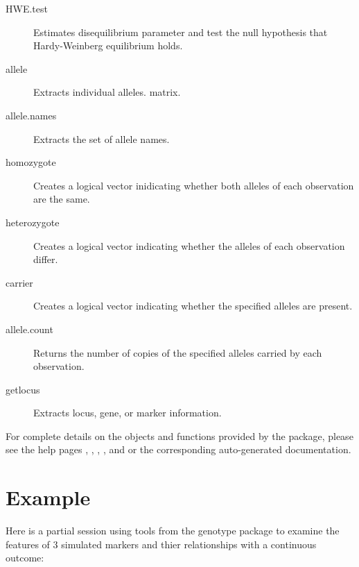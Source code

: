 \documentclass{report}
\begin{document}
\begin{description}
  
\item[HWE.test] Estimates disequilibrium parameter and test the null
  hypothesis that Hardy-Weinberg equilibrium holds.
  
\item[allele] Extracts individual alleles.
  matrix.

\item[allele.names] Extracts the set of allele names.
  
\item[homozygote] Creates a logical vector inidicating whether both
  alleles of each observation are the same.
  
\item[heterozygote] Creates a logical vector indicating whether the
  alleles of each observation differ.
  
\item[carrier] Creates a logical vector indicating whether
  the specified alleles are present.
  
\item[allele.count] Returns the number of copies of the specified
  alleles carried by each observation.
  
\item[getlocus] Extracts locus, gene, or marker information.

\end{description}

For complete details on the objects and functions provided by the
 package, please see the help pages ,
, , , and
 or the corresponding auto-generated documentation.

\section{Example}

Here is a partial session using tools from the genotype package to
examine the features of 3 simulated markers and thier relationships
with a continuous outcome:
\end{document}

